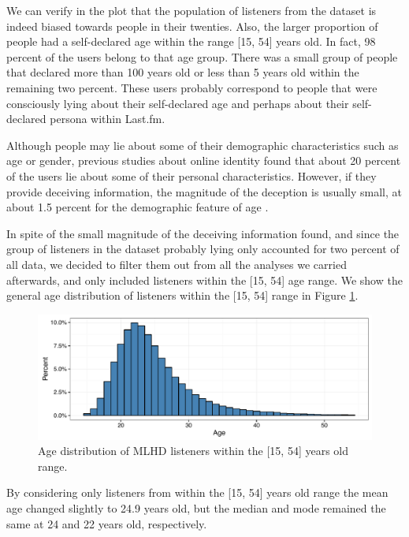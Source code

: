 We can verify in the plot that the population of listeners from the dataset is indeed biased towards people in their twenties. Also, the larger proportion of people had a self-declared age within the range [15, 54] years old. In fact, 98 percent of the users belong to that age group. 
There was a small group of people that declared more than 100 years old or less than 5 years old within the remaining two percent. These users probably correspond to people that were consciously lying about their self-declared age and perhaps about their self-declared persona within Last.fm.

Although people may lie about some of their demographic characteristics such as age or gender, previous studies about online identity found that about 20 percent of the users lie about some of their personal characteristics. However, if they provide deceiving information, the magnitude of the deception is usually small, at about 1.5 percent for the demographic feature of age \autocite{counts09self,hancock07truth}.

In spite of the small magnitude of the deceiving information found, and since the group of listeners in the dataset probably lying  only accounted for two percent of all data, we decided to filter them out from all the analyses we carried afterwards, and only included listeners within the [15, 54] age range.
We show the general age distribution of listeners within the [15, 54] range in Figure \ref{fig:1_age_frequency_3_C}.

\begin{figure}[!h]
\centering
\includegraphics[width=1.0\textwidth]{1_age_frequency_3.pdf}		
\caption[General age distribution of listeners in the dataset]{Age distribution of MLHD listeners within the [15, 54] years old range.}
\label{fig:1_age_frequency_3_C}
\end{figure}

By considering only listeners from within the [15, 54] years old range the mean age changed slightly to 24.9 years old, but the median and mode remained the same at 24 and 22 years old, respectively. 


